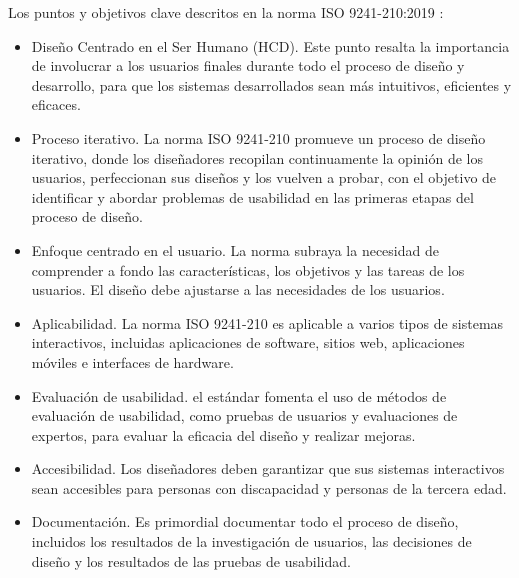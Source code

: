 Los puntos y objetivos clave descritos en la norma ISO 9241-210:2019 \cite{ref62}:

\begin{itemize}
    \item Diseño Centrado en el Ser Humano (HCD). Este punto resalta la importancia de involucrar a los usuarios finales durante todo el proceso de diseño y desarrollo, para que los sistemas desarrollados sean más intuitivos, eficientes y eficaces.
    \item Proceso iterativo. La norma ISO 9241-210 promueve un proceso de diseño iterativo, donde los diseñadores recopilan continuamente la opinión de los usuarios, perfeccionan sus diseños y los vuelven a probar, con el objetivo de identificar y abordar problemas de usabilidad en las primeras etapas del proceso de diseño.
    \item Enfoque centrado en el usuario. La norma subraya la necesidad de comprender a fondo las características, los objetivos y las tareas de los usuarios. El diseño debe ajustarse a las necesidades de los usuarios.
    \item Aplicabilidad. La norma ISO 9241-210 es aplicable a varios tipos de sistemas interactivos, incluidas aplicaciones de software, sitios web, aplicaciones móviles e interfaces de hardware.
    \item Evaluación de usabilidad. el estándar fomenta el uso de métodos de evaluación de usabilidad, como pruebas de usuarios y evaluaciones de expertos, para evaluar la eficacia del diseño y realizar mejoras.
    \item Accesibilidad. Los diseñadores deben garantizar que sus sistemas interactivos sean accesibles para personas con discapacidad y personas de la tercera edad.
    \item Documentación. Es primordial documentar todo el proceso de diseño, incluidos los resultados de la investigación de usuarios, las decisiones de diseño y los resultados de las pruebas de usabilidad.
\end{itemize}